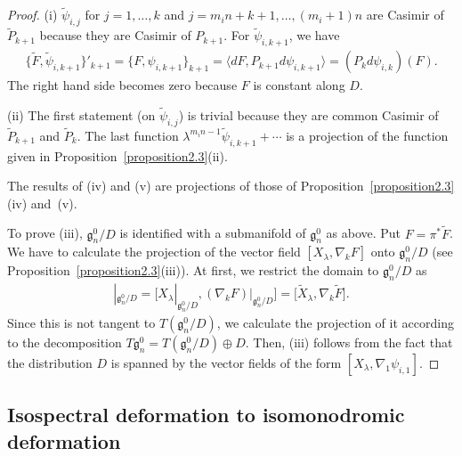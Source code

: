 \documentclass[10pt,a4paper]{amsart}
\numberwithin{equation}{section}
\begin{document}
\begin{proof}
(i) $\widetilde{\psi}_{i,j}$ for $j=1,\dots ,k$ and $j=m_in+k+1, \dots , (m_i+1)n$ are Casimir of $\widetilde{P}_{k+1}$ because they are Casimir of $P_{k+1}$. For $\widetilde{\psi}_{i,k+1}$, we have
\begin{gather*}
\big\{ \widetilde{F}, \widetilde{\psi}_{i,k+1} \big\}'_{k+1}
 = \{ F, \psi_{i, k+1}\}_{k+1} = \langle dF , P_{k+1}d\psi_{i,k+1}\rangle = (P_k d\psi_{i,k})(F).
\end{gather*}
The right hand side becomes zero because $F$ is constant along $D$.

(ii) The f\/irst statement (on $\widetilde{\psi}_{i,j}$) is trivial because they are common Casimir of $\widetilde{P}_{k+1}$ and $\widetilde{P}_k$.
The last function $\lambda ^{m_in-1} \widetilde{\psi}_{i,k+1} + \cdots $ is a projection of the function given in Proposition~\ref{proposition2.3}(ii).

The results of (iv) and (v) are projections of those of Proposition~\ref{proposition2.3}(iv) and~(v).

To prove (iii), $\mathfrak{g}^0_n/D$ is identif\/ied with a submanifold of $\mathfrak{g}^0_n$ as above. Put $F = \pi^* \widetilde{F}$. We have to calculate the projection of the vector f\/ield $[X_\lambda , \nabla _kF]$ onto $\mathfrak{g}^0_n/D$ (see Proposition~\ref{proposition2.3}(iii)).
At f\/irst, we restrict the domain to $\mathfrak{g}^0_n/D$ as
\begin{gather*}
[X_\lambda , \nabla _kF]|_{\mathfrak{g}^0_n/D}
 = \big[X_\lambda |_{\mathfrak{g}^0_n/D}, (\nabla_k F)|_{\mathfrak{g}^0_n/D}\big]
 = \big[\widetilde{X}_\lambda , \nabla _k \widetilde{F}\big].
\end{gather*}
Since this is not tangent to $T(\mathfrak{g}^0_n/D)$, we calculate the projection of it according to the decomposition $T\mathfrak{g}^0_n = T(\mathfrak{g}^0_n/D) \oplus D$. Then, (iii) follows from the fact that the distribution $D$ is spanned by the vector f\/ields of the form $[X_\lambda , \nabla _1 \psi _{i,1}]$.
\end{proof}

\subsection{Isospectral deformation to isomonodromic deformation}\label{section2.4}
\end{document}
